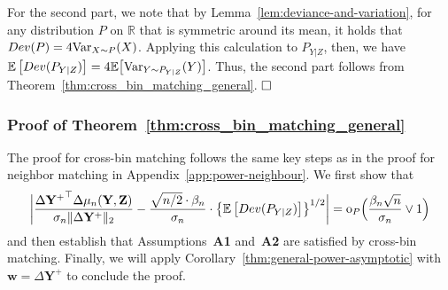 \documentclass[12pt]{article}
\newcommand{\R}{\mathbb{R}}
\newcommand{\EE}[1]{\mathbb{E}\left[{#1}\right]}
\newcommand{\VPst}[2]{\mathrm{Var}_{{#1}}({#2})}
\newcommand{\bY}{\mathbf{Y}}
\newcommand{\bZ}{\mathbf{Z}}
\newcommand{\bw}{\mathbf{w}}
\begin{document}
For the second part, we note that by Lemma~\ref{lem:deviance-and-variation}, for any distribution $P$ on $\R$ that is symmetric around its mean, it holds that $\textnormal{Dev}(P) = 4\VPst{X\sim P}{X}$. Applying this calculation to $P_{Y|Z}$, then, we have $\EE{\textnormal{Dev}(P_{Y|Z})} = 4\mathbb{E}\bigl[\VPst{Y\sim P_{Y\mid Z}}{Y}\bigr]$. Thus, the second part follows from Theorem~\ref{thm:cross_bin_matching_general}.
$\hfill{\square}$

\subsubsection{Proof of Theorem~\ref{thm:cross_bin_matching_general}}
    The proof for cross-bin matching follows the same key steps as in the proof for neighbor matching in Appendix~\ref{app:power-neighbour}. 
    We first show that
   \begin{equation}\label{eq:dom-term-conc-cross-bin}
       \biggl|\frac{{\Delta\bY^+}^\top \Delta \mu_n(\bY,\bZ)}{\sigma_n\|\Delta\bY^+\|_2}-\frac{\sqrt{n/2}\cdot\beta_n}{\sigma_n}\cdot \bigl\{\EE{\textnormal{Dev}(P_{Y\mid Z})}\bigr\}^{1/2} \biggr|=\mathrm{o}_P\Bigl(\frac{\beta_n\sqrt{n}}{\sigma_n}\vee 1\Bigr)
   \end{equation}
    and then establish that Assumptions~\textbf{A1} and~\textbf{A2} are satisfied by cross-bin matching.  Finally, we will apply Corollary~\ref{thm:general-power-asymptotic} with $\bw=\Delta \bY^+$ to conclude the proof.
    
\end{document}
